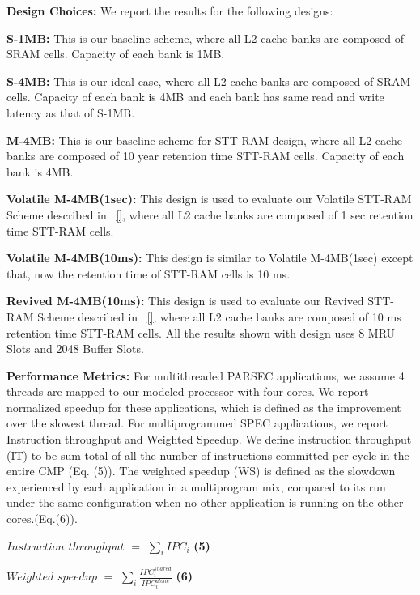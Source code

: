 \noindent\textbf{Design Choices:}
We report the results for the following designs:
\squishlist
\item {\bf S-1MB:} This is our baseline scheme, where all L2 cache banks are
composed of SRAM cells. Capacity of each bank  is 1MB. 
\item {\bf S-4MB:} This is our ideal case, where all L2 cache banks
are composed of SRAM cells. Capacity of each bank is 4MB and each bank
has same read and write latency as that of S-1MB.
\item {\bf M-4MB:} This is our baseline scheme for STT-RAM design, where
all L2 cache banks are composed of 10 year retention time STT-RAM cells. 
Capacity of each bank is 4MB.  
\item{\bf Volatile M-4MB(1sec):} This design is used to evaluate our 
 Volatile STT-RAM Scheme described in ~\ref{}, where all L2 cache 
banks are composed of 1 sec retention time STT-RAM cells. 
\item {\bf Volatile M-4MB(10ms):} This design is similar to Volatile M-4MB(1sec)
except that, now the retention time of STT-RAM cells is 10 ms.
\item {\bf Revived M-4MB(10ms):} This design is used to evaluate our 
 Revived STT-RAM Scheme described in ~\ref{}, where all L2 cache 
banks are composed of 10 ms retention time STT-RAM cells. All the
results shown with design uses 8 MRU Slots and 2048 Buffer Slots. 
\squishend

\noindent\textbf{Performance Metrics:}
For multithreaded PARSEC applications, we assume 4 threads are mapped to our modeled
processor with four cores. We report normalized speedup for these applications, 
which is defined as the improvement over the slowest thread. 
For multiprogrammed SPEC applications, we report Instruction throughput and Weighted Speedup.
We define instruction throughput (IT) to be sum total of all the number of instructions committed
per cycle in the entire CMP (Eq. (5)).  The weighted speedup (WS) is defined as the slowdown experienced
by each application in a multiprogram mix, compared to its run under the same
configuration when no other application is running on the other cores.(Eq.(6)).

{
 $Instruction$ $throughput$ $=$ $\displaystyle\sum_{i} IPC_{i}$ \hspace{1mm} \textbf{(5)}

 $Weighted$ $speedup$ $=$ $\displaystyle\sum_{i}
\frac{IPC_{i}^{shared}}{IPC_{i}^{alone}}$ \hspace{1mm} \textbf{(6)}

}

